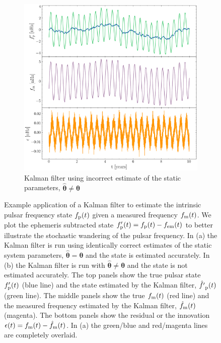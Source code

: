 \documentclass[fleqn,usenatbib,useAMS]{mnras}
\begin{document}
\begin{figure}
\begin{subfigure}[b]{0.49\textwidth}
		\includegraphics[width=\textwidth]{images/Kalman_example_wrong_params}
		\caption{Kalman filter using incorrect estimate of the static parameters, $\hat{\boldsymbol{\theta}} \neq \boldsymbol{\theta}$}
		\label{fig:25MB_bfs}
	\end{subfigure}
	\caption{Example application of a Kalman filter to estimate the intrinsic pulsar frequency state $f_{\rm p}(t)$ given a measured frequency $f_{\rm m}(t)$. We plot the ephemeris subtracted state $f'_{\rm p}(t) = f_{\rm p}(t) - f_{\rm em} (t)$ to better illustrate the stochastic wandering of the pulsar frequency. In (a) the Kalman filter is run using identically correct estimates of the static system parameters, $\hat{\boldsymbol{\theta}} = \boldsymbol{\theta}$ and the state is estimated accurately. In (b) the Kalman filter is run with $\hat{\boldsymbol{\theta}} \neq \boldsymbol{\theta}$ and the state is not estimated accurately. The top panels show the true pulsar state $f'_{\rm p}(t)$ (blue line) and the state estimated by the Kalman filter, $\hat{f'}_{\rm p}(t)$ (green line). The middle panels show the true $f_{\rm m}(t)$ (red line) and the measured frequency estimated  by the Kalman filter, $\hat{f}_{\rm m}(t)$ (magenta). The bottom panels show the residual or the innovation $\epsilon(t) =f_{\rm m}(t) - \hat{f}_{\rm m}(t)$. In (a) the green/blue and red/magenta lines are completely overlaid.}
	\label{fig:four figures}
\end{figure}
\end{document}
